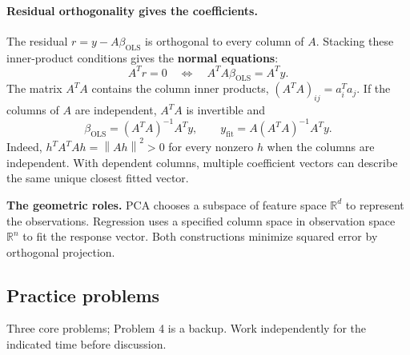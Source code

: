 \documentclass[11pt]{article}
\newcommand{\R}{\mathbb R}
\newcommand{\norm}[1]{\left\lVert#1\right\rVert}
\newcommand{\ols}{\mathrm{OLS}}
\begin{document}
\paragraph{Residual orthogonality gives the coefficients.}
The residual $r=y-A\beta_{\ols}$ is orthogonal to every column of $A$.
Stacking these inner-product conditions gives the \textbf{normal equations}:
\[
 A^Tr=0\quad\Longleftrightarrow\quad A^TA\beta_{\ols}=A^Ty.
\]
The matrix $A^TA$ contains the column inner products,
$(A^TA)_{ij}=a_i^Ta_j$. If the columns of $A$ are independent, $A^TA$
is invertible and
\[
 \boxed{\beta_{\ols}=(A^TA)^{-1}A^Ty,\qquad
 y_{\mathrm{fit}}=A(A^TA)^{-1}A^Ty.}
\]
Indeed, $h^TA^TAh=\norm{Ah}^2>0$ for every nonzero $h$ when the columns
are independent. With dependent columns, multiple coefficient vectors
can describe the same unique closest fitted vector.

\smallskip
\noindent\textbf{The geometric roles.} PCA chooses a subspace of feature
space $\R^d$ to represent the observations. Regression uses a specified
column space in observation space $\R^n$ to fit the response vector.
Both constructions minimize squared error by orthogonal projection.

\newpage
\subsection*{Practice problems}
\noindent Three core problems; Problem 4 is a backup. Work independently
for the indicated time before discussion.
\end{document}
